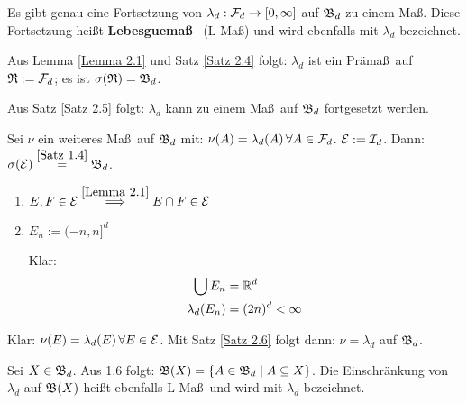 \documentclass[a4paper,twoside,DIV15,BCOR12mm,chapterprefix=true,headings=onelinechapter]{scrbook}
\begin{document}
\begin{satz}%
\label{Satz 2.7}
Es gibt genau eine Fortsetzung von \(\lambda_{d}:\mathcal{F}_{d}\to[0,\infty]\) auf
\(\mathfrak{B}_{d}\) zu einem Ma\ss. Diese Fortsetzung hei\ss t \textbf{Lebesguemaß} \ (L-Ma\ss)
und wird ebenfalls mit \(\lambda_{d}\) bezeichnet.
\end{satz}
\begin{beweis}
Aus Lemma \ref{Lemma 2.1} und Satz \ref{Satz 2.4} folgt: \(\lambda_{d}\) ist ein
Pr\"ama\ss \ auf \(\mathfrak{R}:=\mathcal{F}_{d}\); es ist \(\sigma(\mathfrak{R})=\mathfrak{B}_{d}\).

Aus Satz \ref{Satz 2.5} folgt: \(\lambda_{d}\) kann zu einem Ma\ss \ auf 
\(\mathfrak{B}_{d}\) fortgesetzt werden.

Sei \(\nu\) ein weiteres Ma\ss \ auf \(\mathfrak{B}_{d}\) mit: 
\(\nu(A)=\lambda_{d}(A)\,\forall A\in\mathcal{F}_{d}\). \(\mathcal{E}:=\mathcal{I}_{d}\). Dann:
\(\sigma(\mathcal{E})\overset{\ref{Satz 1.4}}{=}\mathfrak{B}_{d}\).
\begin{enumerate}
\item \(E,F\in\mathcal{E}\overset{\ref{Lemma 2.1}}{\implies}E\cap F\in\mathcal{E}\)
\item \(E_{n}:=(-n,n]^{d}\)

Klar: 
\begin{align*}
\bigcup E_{n}&=\mathbb{R}^{d}\\
\lambda_{d}(E_{n})&=(2n)^{d}<\infty
\end{align*}
\end{enumerate}
Klar: \(\nu(E)=\lambda_{d}(E)\,\forall E\in\mathcal{E}\). Mit Satz \ref{Satz 2.6} folgt
dann: \(\nu=\lambda_{d}\) auf \(\mathfrak{B}_{d}\).
\end{beweis}

\begin{bemerkung}
Sei \(X\in\mathfrak{B}_{d}\). Aus 1.6 folgt: \(\mathfrak{B}(X)=\{A\in\mathfrak{B}_{d}\mid A\subseteq X\}\).
Die Einschr\"ankung von \(\lambda_{d}\) auf \(\mathfrak{B}(X)\) hei\ss t ebenfalls
L-Ma\ss \ und wird mit \(\lambda_{d}\) bezeichnet.
\end{bemerkung}
\end{document}
